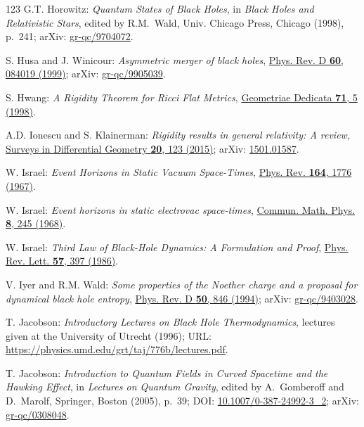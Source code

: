 \begin{thebibliography}{123}
G.T. Horowitz:
{\em Quantum States of Black Holes},
in {\em Black Holes and Relativistic Stars}, edited by R.M.~Wald,
Univ. Chicago Press, Chicago (1998), p.~241;
arXiv: \href{https://arxiv.org/abs/gr-qc/9704072}{gr-qc/9704072}.

S. Husa and J. Winicour:
{\em Asymmetric merger of black holes},
\href{https://doi.org/10.1103/PhysRevD.60.084019}{Phys. Rev. D {\bf 60}, 084019 (1999)};
arXiv: \href{https://arxiv.org/abs/gr-qc/9905039}{gr-qc/9905039}.

S. Hwang:
{\em A Rigidity Theorem for Ricci Flat Metrics},
\href{https://doi.org/10.1023/A:1005094911005}{Geometriae Dedicata {\bf 71}, 5 (1998)}.

A.D. Ionescu and S. Klainerman:
{\em Rigidity results in general relativity: A review},
\href{https://dx.doi.org/10.4310/SDG.2015.v20.n1.a6}{Surveys in Differential Geometry {\bf 20}, 123 (2015)};
arXiv: \href{https://arxiv.org/abs/1501.01587}{1501.01587}.

W. Israel: {\em Event Horizons in Static Vacuum Space-Times},
\href{https://doi.org/10.1103/PhysRev.164.1776}{Phys. Rev. {\bf 164}, 1776 (1967)}.

W. Israel: {\em Event horizons in static electrovac space-times},
\href{https://doi.org/10.1007/BF01645859}{Commun. Math. Phys. {\bf 8}, 245 (1968)}.

W. Israel:
{\em Third Law of Black-Hole Dynamics: A Formulation and Proof},
\href{https://doi.org/10.1103/PhysRevLett.57.397}{Phys. Rev. Lett. {\bf 57}, 397 (1986)}.

V. Iyer and R.M. Wald:
{\em Some properties of the Noether charge and a proposal for dynamical black hole entropy},
\href{https://doi.org/10.1103/PhysRevD.50.846}{Phys. Rev. D {\bf 50}, 846 (1994)};
arXiv: \href{https://arxiv.org/abs/gr-qc/9403028}{gr-qc/9403028}.

T. Jacobson:
{\em Introductory Lectures on Black Hole Thermodynamics},
lectures given at the University of Utrecht (1996);
URL: \url{https://physics.umd.edu/grt/taj/776b/lectures.pdf}.

T. Jacobson:
{\em Introduction to Quantum Fields in Curved Spacetime and the Hawking Effect},
in {\em Lectures on Quantum Gravity}, edited by A.~Gomberoff and D.~Marolf,
Springer, Boston (2005), p.~39;
DOI: \href{https://doi.org/10.1007/0-387-24992-3_2}{10.1007/0-387-24992-3\_2};
arXiv: \href{https://arxiv.org/abs/gr-qc/0308048}{gr-qc/0308048}.


\end{thebibliography}
